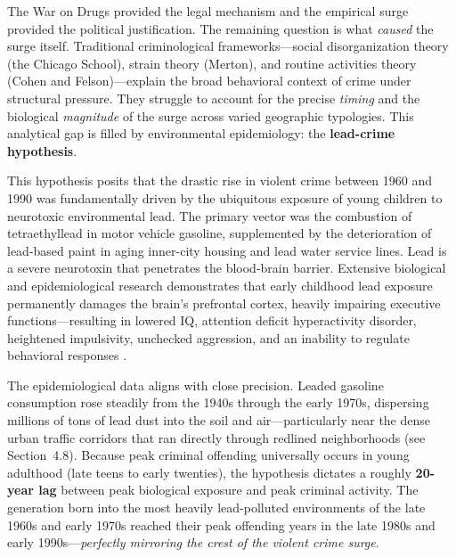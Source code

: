 The War on Drugs provided the legal mechanism and the empirical surge provided the political justification. The remaining question is what \textit{caused} the surge itself. Traditional criminological frameworks---social disorganization theory (the Chicago School), strain theory (Merton), and routine activities theory (Cohen and Felson)---explain the broad behavioral context of crime under structural pressure. They struggle to account for the precise \textit{timing} and the biological \textit{magnitude} of the surge across varied geographic typologies. This analytical gap is filled by environmental epidemiology: the \textbf{lead-crime hypothesis}.

This hypothesis posits that the drastic rise in violent crime between 1960 and 1990 was fundamentally driven by the ubiquitous exposure of young children to neurotoxic environmental lead. The primary vector was the combustion of tetraethyllead in motor vehicle gasoline, supplemented by the deterioration of lead-based paint in aging inner-city housing and lead water service lines. Lead is a severe neurotoxin that penetrates the blood-brain barrier. Extensive biological and epidemiological research demonstrates that early childhood lead exposure permanently damages the brain's prefrontal cortex, heavily impairing executive functions---resulting in lowered IQ, attention deficit hyperactivity disorder, heightened impulsivity, unchecked aggression, and an inability to regulate behavioral responses \cite{reyes2007, nevin2007}.

The epidemiological data aligns with close precision. Leaded gasoline consumption rose steadily from the 1940s through the early 1970s, dispersing millions of tons of lead dust into the soil and air---particularly near the dense urban traffic corridors that ran directly through redlined neighborhoods (see Section~4.8). Because peak criminal offending universally occurs in young adulthood (late teens to early twenties), the hypothesis dictates a roughly \textbf{20-year lag} between peak biological exposure and peak criminal activity. The generation born into the most heavily lead-polluted environments of the late 1960s and early 1970s reached their peak offending years in the late 1980s and early 1990s---\textit{perfectly mirroring the crest of the violent crime surge}.

